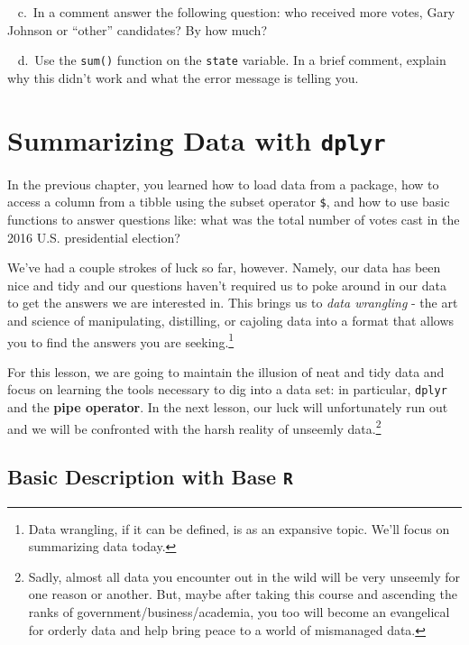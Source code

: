 \documentclass[
]{book}
\begin{document}
~ c.~In a comment answer the following question: who received more votes, Gary Johnson or ``other'' candidates? By how much?

~ d.~Use the \texttt{sum()} function on the \texttt{state} variable. In a brief comment, explain why this didn't work and what the error message is telling you.

\hypertarget{summarizing-data-with-dplyr}{%
\chapter{\texorpdfstring{Summarizing Data with \texttt{dplyr}}{Summarizing Data with dplyr}}\label{summarizing-data-with-dplyr}}

In the previous chapter, you learned how to load data from a package, how to access a column from a tibble using the subset operator \texttt{\$}, and how to use basic functions to answer questions like: what was the total number of votes cast in the 2016 U.S. presidential election?

We've had a couple strokes of luck so far, however. Namely, our data has been nice and tidy and our questions haven't required us to poke around in our data to get the answers we are interested in. This brings us to \emph{data wrangling} - the art and science of manipulating, distilling, or cajoling data into a format that allows you to find the answers you are seeking.\footnote{Data wrangling, if it can be defined, is as an expansive topic. We'll focus on summarizing data today.}

For this lesson, we are going to maintain the illusion of neat and tidy data and focus on learning the tools necessary to dig into a data set: in particular, \texttt{dplyr} and the \textbf{pipe operator}. In the next lesson, our luck will unfortunately run out and we will be confronted with the harsh reality of unseemly data.\footnote{Sadly, almost all data you encounter out in the wild will be very unseemly for one reason or another. But, maybe after taking this course and ascending the ranks of government/business/academia, you too will become an evangelical for orderly data and help bring peace to a world of mismanaged data.}

\hypertarget{basic-description-with-base-r}{%
\section{\texorpdfstring{Basic Description with Base \texttt{R}}{Basic Description with Base R}}\label{basic-description-with-base-r}}
\end{document}
